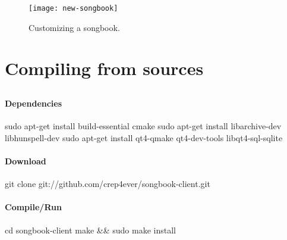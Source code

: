 \begin{figure}
  \centering
  \texttt{[image: new-songbook]}
  \caption{Customizing a songbook.}
  \label{fig:new-songbook}
\end{figure}

\section{Compiling from sources}

\subsection{\linux}

\paragraph{Dependencies}

\begin{unix}
  sudo apt-get install build-essential cmake
  sudo apt-get install libarchive-dev libhunspell-dev
  sudo apt-get install qt4-qmake qt4-dev-tools libqt4-sql-sqlite
\end{unix}

\paragraph{Download}

\begin{unix}
  git clone git://github.com/crep4ever/songbook-client.git
\end{unix}

\paragraph{Compile/Run}

\begin{unix}
  cd songbook-client
  make && sudo make install
\end{unix}

\subsection{\windows}


